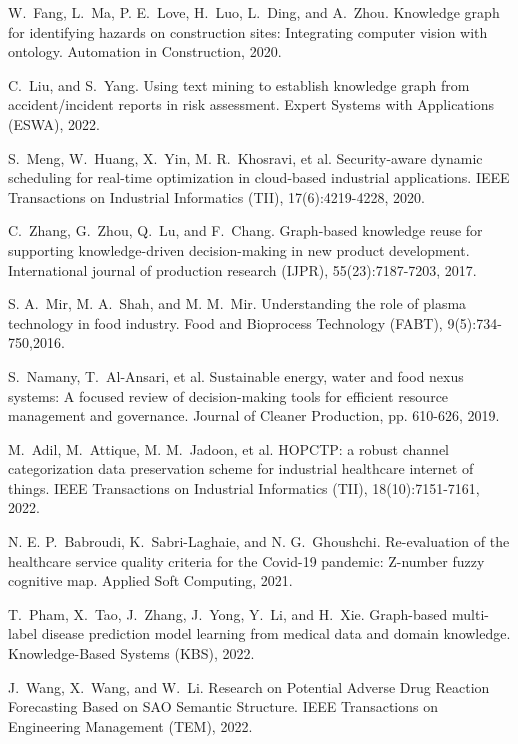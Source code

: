 \documentclass[11pt]{article}
\begin{document}
\begin{thebibliography}{10}
\begin{small}
 W.~Fang, L.~Ma, P. E.~Love, H.~Luo, L.~Ding, and A.~Zhou. \newblock  Knowledge graph for identifying hazards on construction sites: Integrating computer vision with ontology. \newblock Automation in Construction, 2020.

 C.~Liu, and S.~Yang. \newblock Using text mining to establish knowledge graph from accident/incident reports in risk assessment. \newblock Expert Systems with Applications (ESWA), 2022.

 S.~Meng, W.~Huang, X.~Yin, M. R.~Khosravi, et al. \newblock Security-aware dynamic scheduling for real-time optimization in cloud-based industrial applications. \newblock IEEE Transactions on Industrial Informatics (TII), 17(6):4219-4228, 2020.

 C.~Zhang, G.~Zhou, Q.~Lu, and F.~Chang. \newblock  Graph-based knowledge reuse for supporting knowledge-driven decision-making in new product development. \newblock International journal of production research (IJPR), 55(23):7187-7203, 2017.

 S. A.~Mir, M. A.~Shah, and M. M.~Mir. \newblock Understanding the role of plasma technology in food industry. \newblock Food and Bioprocess Technology (FABT), 9(5):734-750,2016.

 S.~Namany, T.~Al-Ansari, et al. \newblock Sustainable energy, water and food nexus systems: A focused review of decision-making tools for efficient resource management and governance. \newblock Journal of Cleaner Production, pp. 610-626, 2019.

 M.~Adil, M.~Attique, M. M.~Jadoon, et al. \newblock HOPCTP: a robust channel categorization data preservation scheme for industrial healthcare internet of things. \newblock
IEEE Transactions on Industrial Informatics (TII), 18(10):7151-7161, 2022.


 N. E. P.~Babroudi, K.~Sabri-Laghaie, and N. G.~Ghoushchi. \newblock Re-evaluation of the healthcare service quality criteria for the Covid-19 pandemic: Z-number fuzzy cognitive map. \newblock Applied Soft Computing, 2021.


 T.~Pham, X.~Tao, J.~Zhang, J.~Yong, Y.~Li, and H.~Xie. \newblock Graph-based multi-label disease prediction model learning from medical data and domain knowledge. \newblock Knowledge-Based Systems (KBS), 2022.


 J.~Wang, X.~Wang, and W.~Li. \newblock Research on Potential Adverse Drug Reaction Forecasting Based on SAO Semantic Structure. \newblock IEEE Transactions on Engineering Management (TEM), 2022.


\end{small}
\end{thebibliography}
\end{document}

